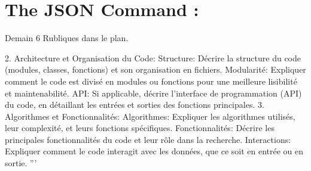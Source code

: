 \section{The JSON Command :}





Demain 6 Rubliques dans le plan.

 
2. Architecture et Organisation du Code:
Structure:
Décrire la structure du code (modules, classes, fonctions) et son organisation en fichiers.
Modularité:
Expliquer comment le code est divisé en modules ou fonctions pour une meilleure lisibilité et maintenabilité.
API:
Si applicable, décrire l'interface de programmation (API) du code, en détaillant les entrées et sorties des fonctions principales. 
3. Algorithmes et Fonctionnalités:
Algorithmes:
Expliquer les algorithmes utilisés, leur complexité, et leurs fonctions spécifiques.
Fonctionnalités:
Décrire les principales fonctionnalités du code et leur rôle dans la recherche.
Interactions:
Expliquer comment le code interagit avec les données, que ce soit en entrée ou en sortie. 
'''